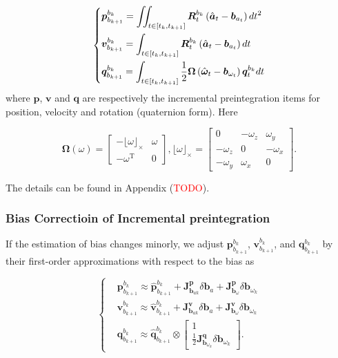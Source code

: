 \documentclass[12pt]{report}   %
\begin{document}
\begin{equation}
\centering
\left\{
\begin{aligned}
&\bm{p}_{b_{k+1}}^{b_k}=\iint_{t\in\left[t_k,t_{k+1}\right]}\bm{R}_{t}^{b_k}\left(\hat{\bm{a}}_{t}-\bm{b}_{a_t}\right)dt^2\\
&\bm{v}_{b_{k+1}}^{b_k}=\int_{t\in\left[t_k,t_{k+1}\right]}\bm{R}_{t}^{b_k}\left(\hat{\bm{a}}_{t}-\bm{b}_{a_t}\right)dt \\
&\bm{q}_{b_{k+1}}^{b_k}=\int_{t\in\left[t_k,t_{k+1}\right]}\frac{1}{2}\bm{\Omega}\left(\hat{\bm{\omega}}_t-\bm{b}_{\omega_t}\right)\bm{q}_t^{b_k}dt
\end{aligned}
\right.
\label{eq.preintegration}
\end{equation}
where $\bm{p}$, $\bm{v}$ and $\bm{q}$ are respectively the
incremental preintegration items for position, velocity and rotation (quaternion
form). Here 

\begin{equation}
\bm{\Omega}\left( \omega \right) = 
\begin{bmatrix}
	- \lfloor \omega \rfloor _ \times & \omega \\
	- \omega ^{\mathrm{T}} & 0
\end{bmatrix}, \lfloor \omega \rfloor _ \times = 
\begin{bmatrix}
	0 & - \omega_z & \omega_y \\
	- \omega_z & 0 & - \omega_x \\
	- \omega_y & \omega_x & 0
\end{bmatrix}.
\label{eq.rot_incremental}
\end{equation}

The details can be found in Appendix (\textcolor{red}{TODO}).


\subsubsection{Bias Correctioin of Incremental preintegration}

If the estimation of bias changes minorly, we adjust $\bm{p}_{b_{k+1}}^{b_k}$, $\bm{v}_{b_{k+1}}^{b_k}$, and $\bm{q}_{b_{k+1}}^{b_k}$ by their first-order approximations with respect to the bias as

\begin{equation}
\left\{
\begin{aligned}
&\bm{p}_{b_{k+1}}^{b_k}\approx\hat{\bm{p}}_{b_{k+1}}^{b_k}+\bm{J}^{\bm{p}}_{\bm{b}_{ak}}\delta\bm{b}_a+\bm{J}^{\bm{p}}_{\bm{b}_\omega}\delta\bm{b}_{\omega_k} \\
&\bm{v}_{b_{k+1}}^{b_k}\approx\hat{\bm{v}}_{b_{k+1}}^{b_k}+\bm{J}^{\bm{v}}_{\bm{b}_{ak}}\delta\bm{b}_a+\bm{J}^{\bm{v}}_{\bm{b}_\omega}\delta\bm{b}_{\omega_k} \\
&\bm{q}_{b_{k+1}}^{b_k}\approx\hat{\bm{q}}_{b_{k+1}}^{b_k}\otimes 
	\begin{bmatrix}
		1 \\ \frac{1}{2}\bm{J}^{\bm{q}}_{\bm{b}_{\omega_k}}\delta\bm{b}_{\omega_k}
	\end{bmatrix}.
\end{aligned}
\right.
\label{eq.bias_correction}
\end{equation}
\end{document}

